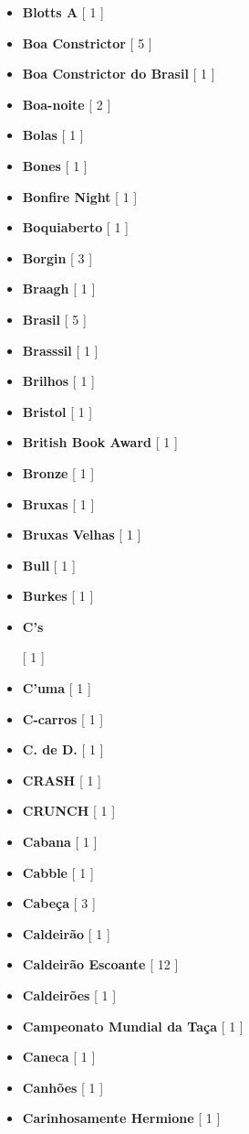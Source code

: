 \documentclass[a4paper]{article}
\begin{document}
{\begin{itemize}
	\item \textbf{Blotts A} [ 1 ]
	\item \textbf{Boa Constrictor} [ 5 ]
	\item \textbf{Boa Constrictor do Brasil} [ 1 ]
	\item \textbf{Boa-noite} [ 2 ]
	\item \textbf{Bolas} [ 1 ]
	\item \textbf{Bones} [ 1 ]
	\item \textbf{Bonfire Night} [ 1 ]
	\item \textbf{Boquiaberto} [ 1 ]
	\item \textbf{Borgin} [ 3 ]
	\item \textbf{Braagh} [ 1 ]
	\item \textbf{Brasil} [ 5 ]
	\item \textbf{Brasssil} [ 1 ]
	\item \textbf{Brilhos} [ 1 ]
	\item \textbf{Bristol} [ 1 ]
	\item \textbf{British Book Award} [ 1 ]
	\item \textbf{Bronze} [ 1 ]
	\item \textbf{Bruxas} [ 1 ]
	\item \textbf{Bruxas Velhas} [ 1 ]
	\item \textbf{Bull} [ 1 ]
	\item \textbf{Burkes} [ 1 ]
	\item \hypertarget{C}{\textbf{C's}} [ 1 ]
	\item \textbf{C'uma} [ 1 ]
	\item \textbf{C-carros} [ 1 ]
	\item \textbf{C. de D.} [ 1 ]
	\item \textbf{CRASH} [ 1 ]
	\item \textbf{CRUNCH} [ 1 ]
	\item \textbf{Cabana} [ 1 ]
	\item \textbf{Cabble} [ 1 ]
	\item \textbf{Cabeça} [ 3 ]
	\item \textbf{Caldeirão} [ 1 ]
	\item \textbf{Caldeirão Escoante} [ 12 ]
	\item \textbf{Caldeirões} [ 1 ]
	\item \textbf{Campeonato Mundial da Taça} [ 1 ]
	\item \textbf{Caneca} [ 1 ]
	\item \textbf{Canhões} [ 1 ]
	\item \textbf{Carinhosamente Hermione} [ 1 ]

\end{itemize}}
\end{document}
